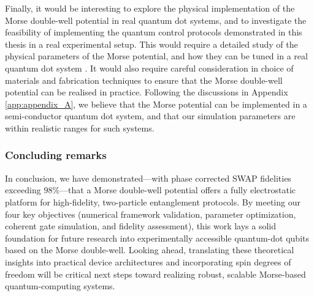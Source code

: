 \documentclass{subfiles}
\begin{document}
Finally, it would be interesting to explore the physical implementation of the Morse double-well potential in real quantum dot systems, and to investigate the feasibility of implementing the quantum control protocols demonstrated in this thesis in a real experimental setup. This would require a detailed study of the physical parameters of the Morse potential, and how they can be tuned in a real quantum dot system \cite{garcia2021semiconductor}. It would also require careful consideration in choice of materials and fabrication techniques to ensure that the Morse double-well potential can be realised in practice. Following the discussions in Appendix \ref{app:appendix_A}, we believe that the Morse potential can be implemented in a semi-conductor quantum dot system, and that our simulation parameters are within realistic ranges for such systems.

\subsubsection*{Concluding remarks}
In conclusion, we have demonstrated—with phase corrected SWAP fidelities exceeding $98\%$—that a Morse double-well potential offers a fully electrostatic platform for high-fidelity, two-particle entanglement protocols. By meeting our four key objectives (numerical framework validation, parameter optimization, coherent gate simulation, and fidelity assessment), this work lays a solid foundation for future research into experimentally accessible quantum-dot qubits based on the Morse double-well. Looking ahead, translating these theoretical insights into practical device architectures and incorporating spin degrees of freedom will be critical next steps toward realizing robust, scalable Morse-based quantum-computing systems.
\end{document}
